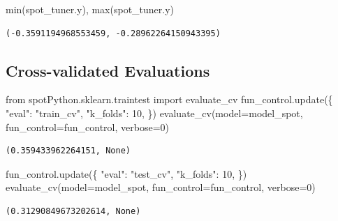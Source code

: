 \documentclass[
  letterpaper,
  DIV=11,
  numbers=noendperiod]{scrreprt}
\newenvironment{Shaded}{\begin{snugshade}}{\end{snugshade}}
\newcommand{\BuiltInTok}[1]{\textcolor[rgb]{0.00,0.23,0.31}{#1}}
\newcommand{\DecValTok}[1]{\textcolor[rgb]{0.68,0.00,0.00}{#1}}
\newcommand{\ImportTok}[1]{\textcolor[rgb]{0.00,0.46,0.62}{#1}}
\newcommand{\NormalTok}[1]{\textcolor[rgb]{0.00,0.23,0.31}{#1}}
\newcommand{\OperatorTok}[1]{\textcolor[rgb]{0.37,0.37,0.37}{#1}}
\newcommand{\StringTok}[1]{\textcolor[rgb]{0.13,0.47,0.30}{#1}}
\begin{document}
\begin{Shaded}
\begin{Highlighting}[]
\BuiltInTok{min}\NormalTok{(spot\_tuner.y), }\BuiltInTok{max}\NormalTok{(spot\_tuner.y)}
\end{Highlighting}
\end{Shaded}

\begin{verbatim}
(-0.3591194968553459, -0.28962264150943395)
\end{verbatim}

\hypertarget{cross-validated-evaluations}{%
\subsection{Cross-validated
Evaluations}\label{cross-validated-evaluations}}

\begin{Shaded}
\begin{Highlighting}[]
\ImportTok{from}\NormalTok{ spotPython.sklearn.traintest }\ImportTok{import}\NormalTok{ evaluate\_cv}
\NormalTok{fun\_control.update(\{}
     \StringTok{"eval"}\NormalTok{: }\StringTok{"train\_cv"}\NormalTok{,}
     \StringTok{"k\_folds"}\NormalTok{: }\DecValTok{10}\NormalTok{,}
\NormalTok{\})}
\NormalTok{evaluate\_cv(model}\OperatorTok{=}\NormalTok{model\_spot, fun\_control}\OperatorTok{=}\NormalTok{fun\_control, verbose}\OperatorTok{=}\DecValTok{0}\NormalTok{)}
\end{Highlighting}
\end{Shaded}

\begin{verbatim}
(0.359433962264151, None)
\end{verbatim}

\begin{Shaded}
\begin{Highlighting}[]
\NormalTok{fun\_control.update(\{}
     \StringTok{"eval"}\NormalTok{: }\StringTok{"test\_cv"}\NormalTok{,}
     \StringTok{"k\_folds"}\NormalTok{: }\DecValTok{10}\NormalTok{,}
\NormalTok{\})}
\NormalTok{evaluate\_cv(model}\OperatorTok{=}\NormalTok{model\_spot, fun\_control}\OperatorTok{=}\NormalTok{fun\_control, verbose}\OperatorTok{=}\DecValTok{0}\NormalTok{)}
\end{Highlighting}
\end{Shaded}

\begin{verbatim}
(0.31290849673202614, None)
\end{verbatim}
\end{document}
